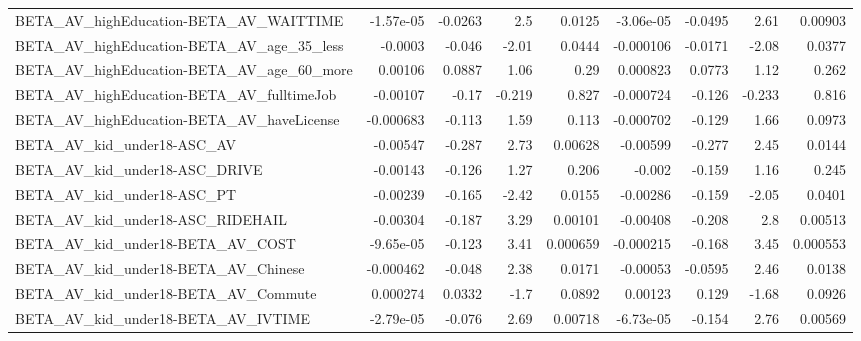 \begin{tabular}{lrrrrrrrr}
BETA\_AV\_highEducation-BETA\_AV\_WAITTIME             &   -1.57e-05 &      -0.0263 &      2.5 &   0.0125 &  -3.06e-05 &     -0.0495 &         2.61 &       0.00903 \\
BETA\_AV\_highEducation-BETA\_AV\_age\_35\_less          &     -0.0003 &       -0.046 &    -2.01 &   0.0444 &  -0.000106 &     -0.0171 &        -2.08 &        0.0377 \\
BETA\_AV\_highEducation-BETA\_AV\_age\_60\_more          &     0.00106 &       0.0887 &     1.06 &     0.29 &   0.000823 &      0.0773 &         1.12 &         0.262 \\
BETA\_AV\_highEducation-BETA\_AV\_fulltimeJob          &    -0.00107 &        -0.17 &   -0.219 &    0.827 &  -0.000724 &      -0.126 &       -0.233 &         0.816 \\
BETA\_AV\_highEducation-BETA\_AV\_haveLicense          &   -0.000683 &       -0.113 &     1.59 &    0.113 &  -0.000702 &      -0.129 &         1.66 &        0.0973 \\
BETA\_AV\_kid\_under18-ASC\_AV                         &    -0.00547 &       -0.287 &     2.73 &  0.00628 &   -0.00599 &      -0.277 &         2.45 &        0.0144 \\
BETA\_AV\_kid\_under18-ASC\_DRIVE                      &    -0.00143 &       -0.126 &     1.27 &    0.206 &     -0.002 &      -0.159 &         1.16 &         0.245 \\
BETA\_AV\_kid\_under18-ASC\_PT                         &    -0.00239 &       -0.165 &    -2.42 &   0.0155 &   -0.00286 &      -0.159 &        -2.05 &        0.0401 \\
BETA\_AV\_kid\_under18-ASC\_RIDEHAIL                   &    -0.00304 &       -0.187 &     3.29 &  0.00101 &   -0.00408 &      -0.208 &          2.8 &       0.00513 \\
BETA\_AV\_kid\_under18-BETA\_AV\_COST                   &   -9.65e-05 &       -0.123 &     3.41 & 0.000659 &  -0.000215 &      -0.168 &         3.45 &      0.000553 \\
BETA\_AV\_kid\_under18-BETA\_AV\_Chinese                &   -0.000462 &       -0.048 &     2.38 &   0.0171 &   -0.00053 &     -0.0595 &         2.46 &        0.0138 \\
BETA\_AV\_kid\_under18-BETA\_AV\_Commute                &    0.000274 &       0.0332 &     -1.7 &   0.0892 &    0.00123 &       0.129 &        -1.68 &        0.0926 \\
BETA\_AV\_kid\_under18-BETA\_AV\_IVTIME                 &   -2.79e-05 &       -0.076 &     2.69 &  0.00718 &  -6.73e-05 &      -0.154 &         2.76 &       0.00569 \\

\end{tabular}
